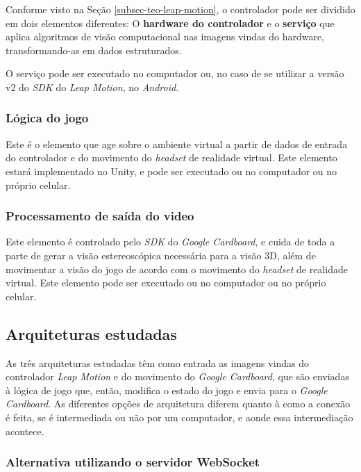 Conforme visto na Seção \ref{subsec-teo-leap-motion}, o controlador pode 
ser dividido em dois elementos diferentes: O \textbf{hardware do controlador} e 
o \textbf{serviço} que aplica algoritmos de visão computacional nas imagens 
vindas do hardware, transformando-as em dados estruturados.

O serviço pode ser executado no computador ou, no caso de se utilizar a versão 
v2 do \textit{SDK} do \textit{Leap Motion}, no \textit{Android}.

\subsubsection{Lógica do jogo}\label{subsubsec-elemento-logica-jogo}

Este é o elemento que age sobre o ambiente virtual a partir de dados de entrada 
do controlador e do movimento do \textit{headset} de realidade virtual. 
Este elemento estará implementado no Unity, e pode ser executado ou no 
computador ou no próprio celular.

\subsubsection{Processamento de saída do video}\label{subsubsec-elemento-video}

Este elemento é controlado pelo \textit{SDK} do \textit{Google Cardboard}, e 
cuida de toda a parte de gerar a visão estereoscópica necessária para a visão 
3D, além de movimentar a visão do jogo de acordo com o movimento do 
\textit{headset} de realidade virtual. Este elemento pode ser executado ou 
no computador ou no próprio celular.

\subsection{Arquiteturas estudadas}\label{subsec-arquiteturas-estudadas}

As três arquiteturas estudadas têm como entrada as imagens vindas do 
controlador \textit{Leap Motion} e do movimento do \textit{Google Cardboard}, 
que são enviadas à lógica de jogo que, então, modifica o estado do jogo e envia 
para o \textit{Google Cardboard}. As diferentes opções de arquitetura diferem 
quanto à como a conexão é feita, se é intermediada ou não por um computador, e 
aonde essa intermediação acontece.

\subsubsection{Alternativa utilizando o servidor WebSocket}\label{subsubsec-arquiteturas-leapmotion-pc-leapdata-android}

